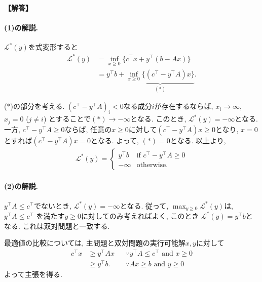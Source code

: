 \documentclass[12pt,a4paper]{article}
\newenvironment{solution}{
    \vspace{0.5em}
    \begin{tcolorbox}[colback=white, colframe=black, boxrule=1pt, arc=0mm, breakable]
    \noindent
    \textbf{【解答】}
    \vspace{0.3em}
}{
    \end{tcolorbox}
    \vspace{1em}
}
\begin{document}
\begin{solution}
\paragraph*{(1)の解説.}

$\mathcal{L}^*(y)$を式変形すると
\begin{align*}
  \mathcal{L}^*(y) &= \inf_{x\ge 0}\{c^\top x + y^\top (b-Ax)\} \\
                  &= y^\top b + \underbrace{\inf_{x\ge 0}\{(c^\top - y^\top A)x\}}_{(*)}.
\end{align*}

($*$)の部分を考える. $(c^\top - y^\top A)_i<0$なる成分$i$が存在するならば, $x_i\to\infty$, $x_j=0$ ($j\ne i$) とすることで$(*)\to-\infty$となる. このとき, $\mathcal{L}^*(y)=-\infty$となる.
一方, $c^\top - y^\top A \ge 0$ならば, 任意の$x\ge 0$に対して$(c^\top - y^\top A)x\ge 0$となり, $x=0$とすれば$(c^\top - y^\top A)x=0$となる. よって, $(*) = 0$となる.
以上より,
\begin{align*}
  \mathcal{L}^*(y) = \begin{cases}
    y^\top b & \text{if } c^\top - y^\top A \ge 0 \\
    -\infty & \text{otherwise}.
  \end{cases}
\end{align*}

\paragraph*{(2)の解説.}

$y^\top A\le c^\top$でないとき, $\mathcal{L}^*(y)=-\infty$となる. 従って, $\max_{y\ge 0} \mathcal{L}^*(y)$は, $y^\top A \le c^\top$ を満たす$y\ge 0$に対してのみ考えればよく, このとき $\mathcal{L}^*(y)=y^\top b$となる. これは双対問題と一致する.

最適値の比較については, 主問題と双対問題の実行可能解$x,y$に対して
\begin{align*}
  c^\top x &\ge y^\top A x & & \because y^\top A \le c^\top\text{ and } x\ge 0 \\
  &\ge y^\top b. & & \because Ax\ge b\text{ and } y\ge 0
\end{align*}
よって主張を得る.


\end{solution}
\end{document}
